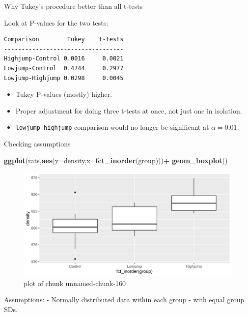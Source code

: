 \documentclass[
  ignorenonframetext,
]{beamer}
\newenvironment{Shaded}{\begin{snugshade}}{\end{snugshade}}
\newcommand{\DataTypeTok}[1]{\textcolor[rgb]{0.13,0.29,0.53}{#1}}
\newcommand{\KeywordTok}[1]{\textcolor[rgb]{0.13,0.29,0.53}{\textbf{#1}}}
\newcommand{\NormalTok}[1]{#1}
\newcommand{\OperatorTok}[1]{\textcolor[rgb]{0.81,0.36,0.00}{\textbf{#1}}}
\providecommand{\tightlist}{%
  \setlength{\itemsep}{0pt}\setlength{\parskip}{0pt}}
\begin{document}
\begin{frame}[fragile]{Why Tukey's procedure better than all t-tests}
\protect\hypertarget{why-tukeys-procedure-better-than-all-t-tests}{}

Look at P-values for the two tests:

\begin{verbatim}
Comparison        Tukey    t-tests
----------------------------------
Highjump-Control 0.0016     0.0021
Lowjump-Control  0.4744     0.2977
Lowjump-Highjump 0.0298     0.0045
\end{verbatim}

\begin{itemize}
\tightlist
\item
  Tukey P-values (mostly) higher.
\item
  Proper adjustment for doing three t-tests at once, not just one in
  isolation.
\item
  \texttt{lowjump-highjump} comparison would no longer be significant at
  \(\alpha = 0.01\).
\end{itemize}

\end{frame}

\begin{frame}[fragile]{Checking assumptions}
\protect\hypertarget{checking-assumptions}{}

\begin{Shaded}
\begin{Highlighting}[]
\KeywordTok{ggplot}\NormalTok{(rats,}\KeywordTok{aes}\NormalTok{(}\DataTypeTok{y=}\NormalTok{density,}\DataTypeTok{x=}\KeywordTok{fct_inorder}\NormalTok{(group)))}\OperatorTok{+}
\KeywordTok{geom_boxplot}\NormalTok{()}
\end{Highlighting}
\end{Shaded}

\begin{figure}
\centering
\includegraphics{figure/unnamed-chunk-160-1.pdf}
\caption{plot of chunk unnamed-chunk-160}
\end{figure}

Assumptions: - Normally distributed data within each group - with equal
group SDs.

\end{frame}
\end{document}
